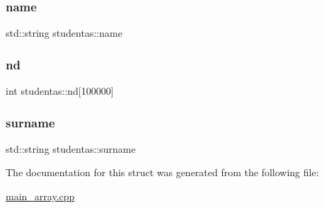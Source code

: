 \subsubsection{\texorpdfstring{name}{name}}
{\footnotesize\ttfamily std\+::string studentas\+::name}

\mbox{\label{structstudentas_a06c14f55fec7773185b110e414e232b7}} 
\subsubsection{\texorpdfstring{nd}{nd}}
{\footnotesize\ttfamily int studentas\+::nd\mbox{[}100000\mbox{]}}

\mbox{\label{structstudentas_ae8ce90faad9e79990e9a6e38f5f2a7e7}} 
\subsubsection{\texorpdfstring{surname}{surname}}
{\footnotesize\ttfamily std\+::string studentas\+::surname}



The documentation for this struct was generated from the following file\+:\begin{DoxyCompactItemize}
\item 
\mbox{\hyperlink{main__array_8cpp}{main\+\_\+array.\+cpp}}\end{DoxyCompactItemize}
